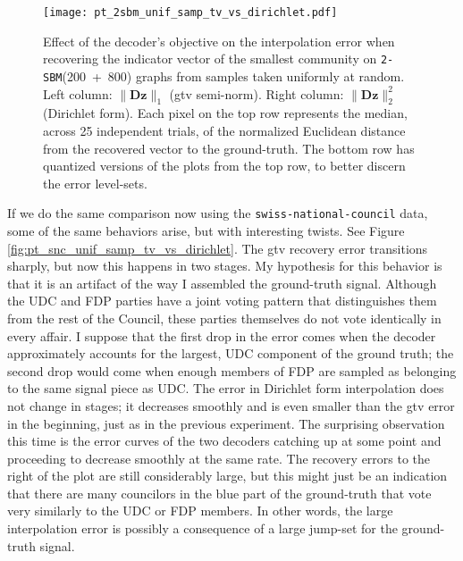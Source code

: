 \begin{figure}[H]
    \centering
    \texttt{[image: pt\_2sbm\_unif\_samp\_tv\_vs\_dirichlet.pdf]}
    \caption[Decoder's objective and the interpolation error: \texttt{2-SBM}(200~+~800)]{Effect of the decoder's objective on the interpolation error when recovering the indicator vector of the smallest community on \texttt{2-SBM}(200~+~800) graphs from samples taken uniformly at random. Left column: $\|\mathbf{Dz}\|_1$ (\acrlong{gtv} semi-norm). Right column: $\|\mathbf{Dz}\|_2^2$ (Dirichlet form). Each pixel on the top row represents the median, across 25 independent trials, of the normalized Euclidean distance from the recovered vector to the ground-truth. The bottom row has quantized versions of the plots from the top row, to better discern the error level-sets.}
    \label{fig:pt_2sbm_unif_samp_tv_vs_dirichlet}
\end{figure}

If we do the same comparison now using the \texttt{swiss-national-council} data, some of the same behaviors arise, but with interesting twists. See Figure \ref{fig:pt_snc_unif_samp_tv_vs_dirichlet}. The \acrshort{gtv} recovery error transitions sharply, but now this happens in two stages. My hypothesis for this behavior is that it is an artifact of the way I assembled the ground-truth signal. Although the UDC and FDP parties have a joint voting pattern that distinguishes them from the rest of the Council, these parties themselves do not vote identically in every affair. I suppose that the first drop in the error comes when the decoder approximately accounts for the largest, UDC component of the ground truth; the second drop would come when enough members of FDP are sampled as belonging to the same signal piece as UDC. The error in Dirichlet form interpolation does not change in stages; it decreases smoothly and is even smaller than the \acrshort{gtv} error in the beginning, just as in the previous experiment. The surprising observation this time is the error curves of the two decoders catching up at some point and proceeding to decrease smoothly at the same rate. The recovery errors to the right of the plot are still considerably large, but this might just be an indication that there are many councilors in the blue part of the ground-truth that vote very similarly to the UDC or FDP members. In other words, the large interpolation error is possibly a consequence of a large jump-set for the ground-truth signal.

